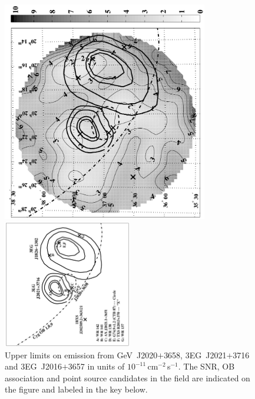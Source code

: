 \begin{figure}[p]
\centerline{\includegraphics[draft=false,angle=270,width=0.8\textwidth]{plots/chap-observations/loenergy/J2021+3716_sul_conv_bw.pdf}}
\centerline{\includegraphics[angle=270,width=0.5\textwidth]{plots/chap-observations/loenergy/J2021+3716_guide_bw.pdf}}
\caption{\label{FIG::OBSERVATIONS::J2020UL} Upper limits on emission 
from GeV~J2020$+$3658, 3EG~J2021$+$3716 and 3EG~J2016$+$3657 in units
of $10^{-11}$\,cm$^{-2}$\,s$^{-1}$. The SNR, OB association and point
source candidates in the field are indicated on the figure and labeled
in the key below.}
\end{figure}

